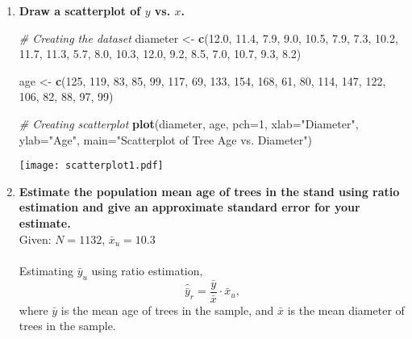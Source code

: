 \documentclass[]{article}
\newenvironment{Shaded}{\begin{snugshade}}{\end{snugshade}}
\newcommand{\AttributeTok}[1]{\textcolor[rgb]{0.13,0.29,0.53}{#1}}
\newcommand{\CommentTok}[1]{\textcolor[rgb]{0.56,0.35,0.01}{\textit{#1}}}
\newcommand{\DecValTok}[1]{\textcolor[rgb]{0.00,0.00,0.81}{#1}}
\newcommand{\FloatTok}[1]{\textcolor[rgb]{0.00,0.00,0.81}{#1}}
\newcommand{\FunctionTok}[1]{\textcolor[rgb]{0.13,0.29,0.53}{\textbf{#1}}}
\newcommand{\NormalTok}[1]{#1}
\newcommand{\OtherTok}[1]{\textcolor[rgb]{0.56,0.35,0.01}{#1}}
\newcommand{\StringTok}[1]{\textcolor[rgb]{0.31,0.60,0.02}{#1}}
\begin{document}
\begin{enumerate}[label=(\alph*)]

\item \textbf{Draw a scatterplot of $y$ vs. $x$.}


\begin{Shaded}
\begin{Highlighting}[]
\CommentTok{\# Creating the dataset}
\NormalTok{diameter }\OtherTok{\textless{}{-}} \FunctionTok{c}\NormalTok{(}\FloatTok{12.0}\NormalTok{, }\FloatTok{11.4}\NormalTok{, }\FloatTok{7.9}\NormalTok{, }\FloatTok{9.0}\NormalTok{, }\FloatTok{10.5}\NormalTok{, }\FloatTok{7.9}\NormalTok{, }\FloatTok{7.3}\NormalTok{, }\FloatTok{10.2}\NormalTok{, }\FloatTok{11.7}\NormalTok{, }\FloatTok{11.3}\NormalTok{,}
              \FloatTok{5.7}\NormalTok{, }\FloatTok{8.0}\NormalTok{, }\FloatTok{10.3}\NormalTok{, }\FloatTok{12.0}\NormalTok{, }\FloatTok{9.2}\NormalTok{, }\FloatTok{8.5}\NormalTok{, }\FloatTok{7.0}\NormalTok{, }\FloatTok{10.7}\NormalTok{, }\FloatTok{9.3}\NormalTok{, }\FloatTok{8.2}\NormalTok{)}

\NormalTok{age }\OtherTok{\textless{}{-}} \FunctionTok{c}\NormalTok{(}\DecValTok{125}\NormalTok{, }\DecValTok{119}\NormalTok{, }\DecValTok{83}\NormalTok{, }\DecValTok{85}\NormalTok{, }\DecValTok{99}\NormalTok{, }\DecValTok{117}\NormalTok{, }\DecValTok{69}\NormalTok{, }\DecValTok{133}\NormalTok{, }\DecValTok{154}\NormalTok{, }\DecValTok{168}\NormalTok{,}
         \DecValTok{61}\NormalTok{, }\DecValTok{80}\NormalTok{, }\DecValTok{114}\NormalTok{, }\DecValTok{147}\NormalTok{, }\DecValTok{122}\NormalTok{, }\DecValTok{106}\NormalTok{, }\DecValTok{82}\NormalTok{, }\DecValTok{88}\NormalTok{, }\DecValTok{97}\NormalTok{, }\DecValTok{99}\NormalTok{)}

\CommentTok{\# Creating scatterplot }
\FunctionTok{plot}\NormalTok{(diameter, age, }\AttributeTok{pch=}\DecValTok{1}\NormalTok{, }\AttributeTok{xlab=}\StringTok{"Diameter"}\NormalTok{, }\AttributeTok{ylab=}\StringTok{"Age"}\NormalTok{, }
     \AttributeTok{main=}\StringTok{"Scatterplot of Tree Age vs. Diameter"}\NormalTok{)}
\end{Highlighting}
\end{Shaded}

\texttt{[image: scatterplot1.pdf]}

\item \textbf{Estimate the population mean age of trees in the stand using ratio estimation and give an approximate standard error for your estimate.} \\
Given: $N = 1132$, $\bar x_u = 10.3$ \\
 \\
Estimating $\bar y_u$ using ratio estimation,
\[
\hat{\bar y}_r = \frac{\bar y}{\bar x}\cdot\bar x_u, \tag{1} \label{yhatr}
\]
where $\bar y$ is the mean age of trees in the sample, and $\bar x$ is the mean diameter of trees in the sample.


\end{enumerate}
\end{document}
